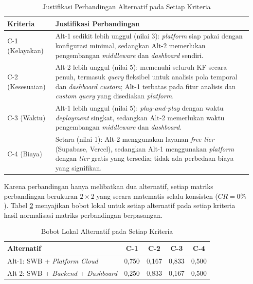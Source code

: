 \begin{table}[H]
  \caption{Justifikasi Perbandingan Alternatif pada Setiap Kriteria}
  \label{tab:justifikasi-kriteria}
  \begin{tabularx}{\textwidth}{| l | X |}
    \hline
    \textbf{Kriteria} & \textbf{Justifikasi Perbandingan} \\
    \hline
    C-1 (Kelayakan) & Alt-1 sedikit lebih unggul (nilai 3): \textit{platform} siap pakai dengan konfigurasi minimal, sedangkan Alt-2 memerlukan pengembangan \textit{middleware} dan \textit{dashboard} sendiri. \\
    \hline
    C-2 (Kesesuaian) & Alt-2 lebih unggul (nilai 5): memenuhi seluruh KF secara penuh, termasuk \textit{query} fleksibel untuk analisis pola temporal dan \textit{dashboard custom}; Alt-1 terbatas pada fitur analisis dan \textit{custom query} yang disediakan \textit{platform}. \\
    \hline
    C-3 (Waktu) & Alt-1 lebih unggul (nilai 5): \textit{plug-and-play} dengan waktu \textit{deployment} singkat, sedangkan Alt-2 memerlukan waktu pengembangan \textit{middleware} dan \textit{dashboard}. \\
    \hline
    C-4 (Biaya) & Setara (nilai 1): Alt-2 menggunakan layanan \textit{free tier} (Supabase, Vercel), sedangkan Alt-1 menggunakan \textit{platform} dengan \textit{tier} gratis yang tersedia; tidak ada perbedaan biaya yang signifikan. \\
    \hline
  \end{tabularx}
\end{table}

Karena perbandingan hanya melibatkan dua alternatif, setiap matriks perbandingan berukuran $2 \times 2$ yang secara matematis selalu konsisten ($CR = 0\%$). Tabel \ref{tab:bobot-lokal} menyajikan bobot lokal untuk setiap alternatif pada setiap kriteria hasil normalisasi matriks perbandingan berpasangan.

\begin{table}[H]
  \caption{Bobot Lokal Alternatif pada Setiap Kriteria}
  \label{tab:bobot-lokal}
  \begin{tabular}{| l | c | c | c | c |}
    \hline
    \textbf{Alternatif} & \textbf{C-1} & \textbf{C-2} & \textbf{C-3} & \textbf{C-4} \\
    \hline
    Alt-1: SWB + \textit{Platform Cloud}       & 0,750 & 0,167 & 0,833 & 0,500 \\
    \hline
    Alt-2: SWB + \textit{Backend} + \textit{Dashboard} & 0,250 & 0,833 & 0,167 & 0,500 \\
    \hline
  \end{tabular}
\end{table}

